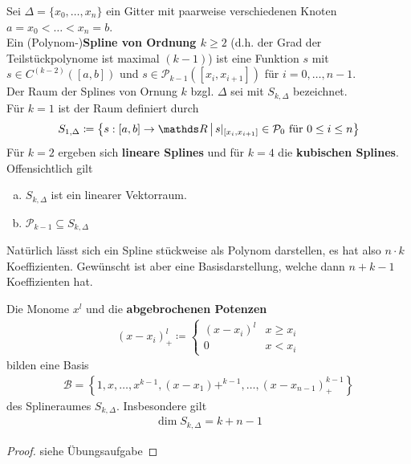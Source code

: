 \begin{Defe}
  Sei $\Delta =\{x_0,\dots,x_n\} $ ein Gitter
  mit paarweise verschiedenen Knoten $a=x_0<\dots<x_n=b$.\\
  Ein (Polynom-)\textbf{Spline von Ordnung $k$}$\geq 2$ 
  (d.h. der Grad der Teilstückpolynome ist maximal $(k-1)$)
  ist eine Funktion $s$ mit $s\in C^{(k-2)}([a,b])$
  und $s\in\mathcal{P}_{k-1}([x_i,x_{i+1}])$
  für $i=0,\dots,n-1$.\\
  Der Raum der Splines von Ornung $k$ bzgl. $\Delta$ sei
  mit $S_{k,\Delta}$ bezeichnet.\\
  Für $k=1$ ist der Raum definiert durch
  \begin{gather*}
    S_{1,\Delta} \coloneqq 
    \left\{
      s:[a,b]\rightarrow\R\,\middle\vert\,
      s|_{[x_i,x_{i+1}]}\in\mathcal{P}_0
      \text{ für } 0\leq i\leq n
    \right\}
  \end{gather*}
  Für $k=2$ ergeben sich \textbf{lineare Splines}
  und für $k=4$ die \textbf{kubischen Splines}.\\
  Offensichtlich gilt
  \begin{enumerate}[a)]
  \item $S_{k,\Delta}$ ist ein linearer Vektorraum.
  \item $\mathcal{P}_{k-1}\subseteq S_{k,\Delta}$
  \end{enumerate}
  Natürlich lässt sich ein Spline stückweise als Polynom darstellen,
  es hat also $n\cdot k$ Koeffizienten.
  Gewünscht ist aber eine Basisdarstellung,
  welche dann $n+k-1$ Koeffizienten hat.
\end{Defe}

\begin{Satze}\label{6.2.2}
  Die Monome $x^l$ und die \textbf{abgebrochenen Potenzen}
  \begin{gather}
    (x-x_i)_+^l\coloneqq
    \begin{cases}
      (x-x_i)^l & x\geq x_i\\
      0         & x<x_i
    \end{cases}
    \label{VI.2.1}
  \end{gather}
  bilden eine Basis
  \begin{gather*}
    \mathcal{B}=
    \left\{
      1,x,\dots,x^{k-1},(x-x_1)+^{k-1},\dots,(x-x_{n-1})_+^{k-1}
    \right\}
  \end{gather*}
  des Splineraumes $S_{k,\Delta}$. Insbesondere gilt
  \begin{gather}
    \dim S_{k,\Delta}=k+n-1
    \label{VI.2.2}
  \end{gather}
  \label{im6.2.2}

  \begin{proof}
    siehe Übungsaufgabe
  \end{proof}
\end{Satze}


